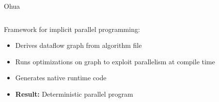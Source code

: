 \documentclass[aspectratio=169, usenames, dvipsnames]{beamer}
\begin{document}
\begin{frame}{Ohua\footnotemark[2]}
  \begin{columns}
    \begin{column}{0.7\textwidth}
      Framework for implicit parallel programming:\\[.55\baselineskip]
      \begin{itemize}
        \item<2-> Derives dataflow graph from algorithm file
        \item<3-> Runs optimizations on graph to exploit parallelism at compile time
        \item<4-> Generates native runtime code
        \item<5-> \textbf{Result:} Deterministic parallel program
      \end{itemize}

      \vspace{1.5em}


\end{column}
\end{columns}
\end{frame}
\end{document}
